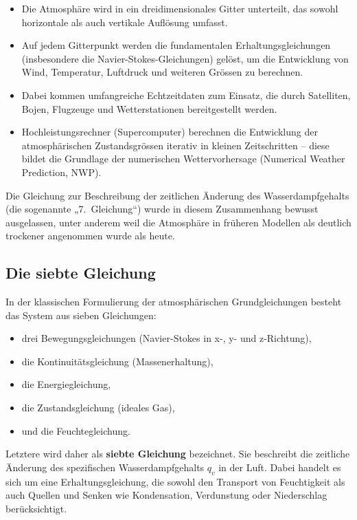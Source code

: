 \begin{itemize}
    \item Die Atmosphäre wird in ein dreidimensionales Gitter unterteilt, das sowohl horizontale als auch vertikale Auflösung umfasst.
    \item Auf jedem Gitterpunkt werden die fundamentalen Erhaltungsgleichungen (insbesondere die Navier-Stokes-Gleichungen) gelöst, um die Entwicklung von Wind, Temperatur, Luftdruck und weiteren Grössen zu berechnen.
    \item Dabei kommen umfangreiche Echtzeitdaten zum Einsatz, die durch Satelliten, Bojen, Flugzeuge und Wetterstationen bereitgestellt werden.
    \item Hochleistungsrechner (Supercomputer) berechnen die Entwicklung der atmosphärischen Zustandsgrössen iterativ in kleinen Zeitschritten – diese bildet die Grundlage der numerischen Wettervorhersage (Numerical Weather Prediction, NWP).
\end{itemize}

Die Gleichung zur Beschreibung der zeitlichen Änderung des Wasserdampfgehalts (die sogenannte „7.~Gleichung“) wurde in diesem Zusammenhang bewusst ausgelassen, unter anderem weil die Atmosphäre in früheren Modellen als deutlich trockener angenommen wurde als heute.

\subsection{Die siebte Gleichung}

In der klassischen Formulierung der atmosphärischen Grundgleichungen besteht das System aus sieben Gleichungen:  
\begin{itemize}
    \item drei Bewegungsgleichungen (Navier-Stokes in x-, y- und z-Richtung),
    \item die Kontinuitätsgleichung (Massenerhaltung),
    \item die Energiegleichung,
    \item die Zustandsgleichung (ideales Gas),
    \item und die Feuchtegleichung.
\end{itemize}

Letztere wird daher als \textbf{siebte Gleichung} bezeichnet. Sie beschreibt die zeitliche Änderung des spezifischen Wasserdampfgehalts $q_v$ in der Luft. Dabei handelt es sich um eine Erhaltungsgleichung, die sowohl den Transport von Feuchtigkeit als auch Quellen und Senken wie Kondensation, Verdunstung oder Niederschlag berücksichtigt.  

